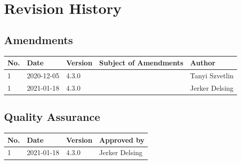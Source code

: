 \documentclass[a4paper]{arrowhead}
\begin{document}
\newpage

\section{Revision History}
\subsection{Amendments}

\noindent\begin{tabularx}{\textwidth}{| p{1cm} | p{3cm} | p{2cm} | X | p{4cm} |} \hline
\rowcolor{gray!33} No. & Date & Version & Subject of Amendments & Author \\ \hline

1 & 2020-12-05 & 4.3.0 &  & Tanyi Szvetlin \\ \hline
1 & 2021-01-18 & 4.3.0 & & Jerker Delsing \\ \hline

\end{tabularx}

\subsection{Quality Assurance}

\noindent\begin{tabularx}{\textwidth}{| p{1cm} | p{3cm} | p{2cm} | X |} \hline
\rowcolor{gray!33} No. & Date & Version & Approved by \\ \hline

1 & 2021-01-18 & 4.3.0 & Jerker Delsing \\ \hline

\end{tabularx}
\end{document}

